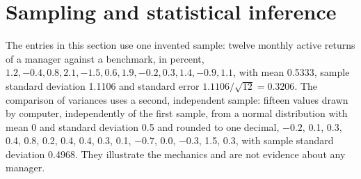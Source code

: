 \section{Sampling and statistical inference}

The entries in this section use one invented sample: twelve monthly active returns of a manager against a benchmark, in percent, $1.2, -0.4, 0.8, 2.1, -1.5, 0.6, 1.9, -0.2, 0.3, 1.4, -0.9, 1.1$, with mean 0.5333, sample standard deviation 1.1106 and standard error $1.1106/\sqrt{12}=0.3206$. The comparison of variances uses a second, independent sample: fifteen values drawn by computer, independently of the first sample, from a normal distribution with mean 0 and standard deviation 0.5 and rounded to one decimal, $-0.2$, 0.1, 0.3, 0.4, 0.8, 0.2, 0.4, 0.4, 0.3, 0.1, $-0.7$, 0.0, $-0.3$, 1.5, 0.3, with sample standard deviation 0.4968. They illustrate the mechanics and are not evidence about any manager.


